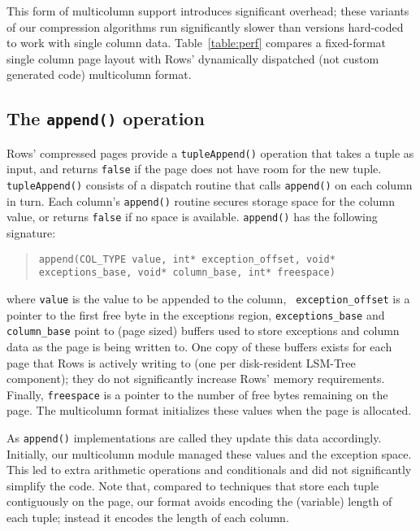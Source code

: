 \documentclass{sig-alternate-sigmod08}
\newcommand{\rows}{Rows\xspace}
\newcommand{\rowss}{Rows'\xspace}
\begin{document}
This form of multicolumn support introduces significant overhead;
these variants of our compression algorithms run significantly slower
than versions hard-coded to work with single column data.
Table~\ref{table:perf} compares a fixed-format single column page
layout with \rowss dynamically dispatched (not custom generated code)
multicolumn format.


\subsection{The {\tt \large append()} operation}

\rowss compressed pages provide a {\tt tupleAppend()} operation that
takes a tuple as input, and returns {\tt false} if the page does not have
room for the new tuple.  {\tt tupleAppend()} consists of a dispatch
routine that calls {\tt append()} on each column in turn.  Each
column's {\tt append()} routine secures storage space for the column
value, or returns {\tt false} if no space is available.  {\tt append()} has the
following signature:
\begin{quote}
  {\tt append(COL\_TYPE value, int* exception\_offset,
       void* exceptions\_base, void* column\_base, int* freespace) }
\end{quote}
where {\tt value} is the value to be appended to the column, {\tt
  exception\_offset} is a pointer to the first free byte in the
exceptions region, {\tt exceptions\_base} and {\tt column\_base} point
to (page sized) buffers used to store exceptions and column data as
the page is being written to.  One copy of these buffers exists for
each page that \rows is actively writing to (one per disk-resident
LSM-Tree component); they do not significantly increase \rowss memory
requirements.  Finally, {\tt freespace} is a pointer to the number of
free bytes remaining on the page.  The multicolumn format initializes
these values when the page is allocated.

As {\tt append()} implementations are called they update this data
accordingly.  Initially, our multicolumn module managed these values
and the exception space.  This led to extra arithmetic operations and
conditionals and did not significantly simplify the code.  Note that,
compared to techniques that store each tuple contiguously on the page,
our format avoids encoding the (variable) length of each tuple; instead
it encodes the length of each column.

\end{document}
